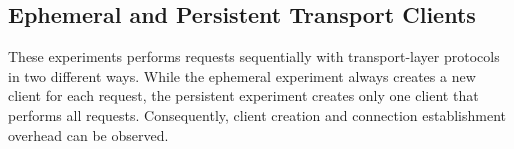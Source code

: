 \subsection{Ephemeral and Persistent Transport Clients}

These experiments performs requests sequentially with transport-layer protocols in two different ways. While the ephemeral experiment always creates a new client for each request, the persistent experiment creates only one client that performs all requests. Consequently, client creation and connection establishment overhead can be observed.


\clearpage


\clearpage


\clearpage
